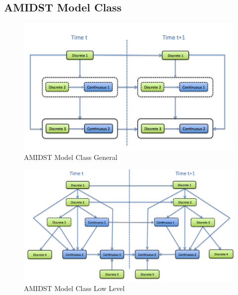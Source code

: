 \subsection{AMIDST Model Class}

\begin{figure}
\begin{center}
\includegraphics[scale=0.4]{./figures/AMIDSTModelClassGeneral}
\caption{\label{Figure:AMIDSTModelClassHighLevel} AMIDST Model Class General}
\end{center}
\end{figure}

\begin{figure}
\begin{center}
\includegraphics[scale=0.4]{./figures/AMIDSTModelClass}
\caption{\label{Figure:AMIDSTModelClass} AMIDST Model Class Low Level}
\end{center}
\end{figure}



